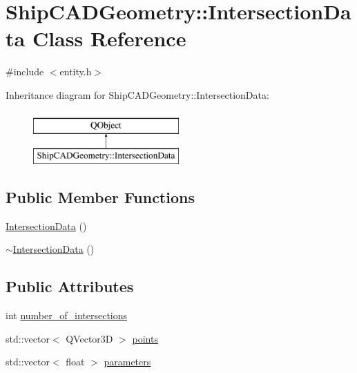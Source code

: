 \hypertarget{classShipCADGeometry_1_1IntersectionData}{\section{Ship\-C\-A\-D\-Geometry\-:\-:Intersection\-Data Class Reference}
\label{classShipCADGeometry_1_1IntersectionData}
}


{\ttfamily \#include $<$entity.\-h$>$}

Inheritance diagram for Ship\-C\-A\-D\-Geometry\-:\-:Intersection\-Data\-:\begin{figure}[H]
\begin{center}
\leavevmode
\includegraphics[height=2.000000cm]{classShipCADGeometry_1_1IntersectionData}
\end{center}
\end{figure}
\subsection*{Public Member Functions}
\begin{DoxyCompactItemize}
\item 
\hyperlink{classShipCADGeometry_1_1IntersectionData_a5c5deb18f585c790f4e3104769a51a13}{Intersection\-Data} ()
\item 
\hyperlink{classShipCADGeometry_1_1IntersectionData_a00da381c70a263a1da5a42adf3aa6e3d}{$\sim$\-Intersection\-Data} ()
\end{DoxyCompactItemize}
\subsection*{Public Attributes}
\begin{DoxyCompactItemize}
\item 
int \hyperlink{classShipCADGeometry_1_1IntersectionData_aff8a7bad6b802779c437df8b558be993}{number\-\_\-of\-\_\-intersections}
\item 
std\-::vector$<$ Q\-Vector3\-D $>$ \hyperlink{classShipCADGeometry_1_1IntersectionData_a7e38232a1c2af3ab1abff06ea87e9e8e}{points}
\item 
std\-::vector$<$ float $>$ \hyperlink{classShipCADGeometry_1_1IntersectionData_ac67f35f563f7c8f4dc7b1096e3ca8439}{parameters}
\end{DoxyCompactItemize}


